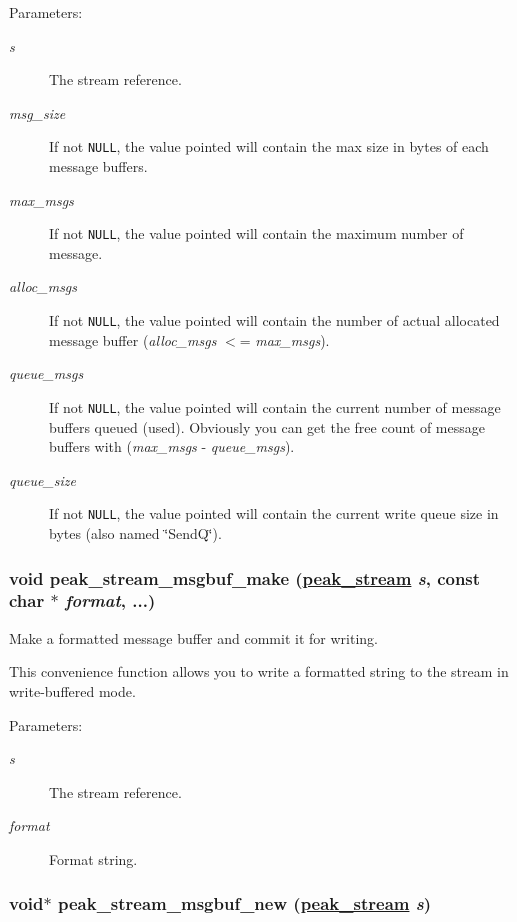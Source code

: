 \begin{Desc}
\item[Parameters:]
\begin{description}
\item[{\em s}]The stream reference. \item[{\em msg\_\-size}]If not {\tt NULL}, the value pointed will contain the max size in bytes of each message buffers. \item[{\em max\_\-msgs}]If not {\tt NULL}, the value pointed will contain the maximum number of message. \item[{\em alloc\_\-msgs}]If not {\tt NULL}, the value pointed will contain the number of actual allocated message buffer ({\em alloc\_\-msgs\/} $<$= {\em max\_\-msgs\/}). \item[{\em queue\_\-msgs}]If not {\tt NULL}, the value pointed will contain the current number of message buffers queued (used). Obviously you can get the free count of message buffers with ({\em max\_\-msgs\/} - {\em queue\_\-msgs\/}). \item[{\em queue\_\-size}]If not {\tt NULL}, the value pointed will contain the current write queue size in bytes (also named \char`\"{}Send\-Q\char`\"{}). \end{description}
\end{Desc}
\hypertarget{group__stream__buf_ga6}{
\subsubsection[peak\_\-stream\_\-msgbuf\_\-make]{\setlength{\rightskip}{0pt plus 5cm}void peak\_\-stream\_\-msgbuf\_\-make (\hyperlink{group__stream_ga0}{peak\_\-stream} {\em s}, const char $\ast$ {\em format}, ...)}}
\label{group__stream__buf_ga6}


Make a formatted message buffer and commit it for writing. 

This convenience function allows you to write a formatted string to the stream in write-buffered mode.

\begin{Desc}
\item[Parameters:]
\begin{description}
\item[{\em s}]The stream reference. \item[{\em format}]Format string. \end{description}
\end{Desc}
\hypertarget{group__stream__buf_ga4}{
\subsubsection[peak\_\-stream\_\-msgbuf\_\-new]{\setlength{\rightskip}{0pt plus 5cm}void$\ast$ peak\_\-stream\_\-msgbuf\_\-new (\hyperlink{group__stream_ga0}{peak\_\-stream} {\em s})}}
\label{group__stream__buf_ga4}


